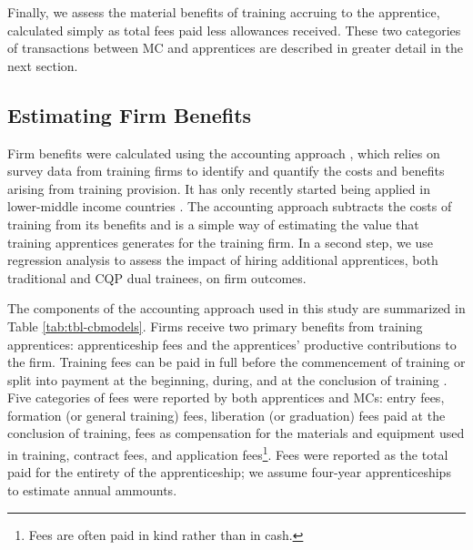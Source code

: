 \documentclass[
  a4paper, twoside, 12pt]{book}
\begin{document}
Finally, we assess the material benefits of training accruing to the apprentice, calculated simply as total fees paid less allowances received. These two categories of transactions between MC and apprentices are described in greater detail in the next section.

\hypertarget{firmmethod}{%
\subsection{Estimating Firm Benefits}\label{firmmethod}}

\begin{singlespacing}

\end{singlespacing}

Firm benefits were calculated using the accounting approach \autocite{gambin2013,muhlemann2014}, which relies on survey data from training firms to identify and quantify the costs and benefits arising from training provision. It has only recently started being applied in lower-middle income countries \autocite{renold2018,bolli2020,bolli2021}. The accounting approach subtracts the costs of training from its benefits and is a simple way of estimating the value that training apprentices generates for the training firm. In a second step, we use regression analysis to assess the impact of hiring additional apprentices, both traditional and CQP dual trainees, on firm outcomes.

The components of the accounting approach used in this study are summarized in Table \ref{tab:tbl-cbmodels}. Firms receive two primary benefits from training apprentices: apprenticeship fees and the apprentices' productive contributions to the firm. Training fees can be paid in full before the commencement of training or split into payment at the beginning, during, and at the conclusion of training \autocite{velenchik1995}. Five categories of fees were reported by both apprentices and MCs: entry fees, formation (or general training) fees, liberation (or graduation) fees paid at the conclusion of training, fees as compensation for the materials and equipment used in training, contract fees, and application fees\footnote{Fees are often paid in kind rather than in cash.}. Fees were reported as the total paid for the entirety of the apprenticeship; we assume four-year apprenticeships to estimate annual ammounts.
\end{document}

